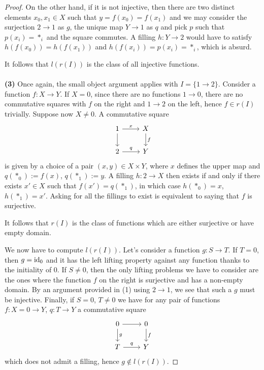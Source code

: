 \documentclass[a4paper,11pt,openany]{scrartcl}
\begin{document}
\begin{proof}
    \noindent On the other hand, if it is not
    injective, then there are two distinct elements $x_0,x_1\in X$ such that
    $y=f(x_0)=f(x_1)$ and we may consider the surjection $2\rightarrow 1$ as
    $g$, the unique map $Y\rightarrow 1$ as $q$ and pick $p$ such that
    $p(x_i)=*_i$ and the square commutes. A filling $h\colon Y\rightarrow 2$
    would have to satisfy $h(f(x_0))=h(f(x_1))$ and $h(f(x_i))=p(x_i)=*_i$,
    which is absurd.

    \noindent It follows that $l(r(I))$ is the class of all injective functions.\\
    \\
     \textbf{(3)} Once again, the small object argument applies with $I=\{1\rightarrow
    2\}$. Consider a function $f\colon X\rightarrow Y$. If $X=0$, since there
    are no functions $1\rightarrow 0$, there are no commutative squares with $f$
    on the right and $1\rightarrow 2$ on the left, hence $f\in r(I)$ trivially.
    Suppose now $X\neq 0$. A commutative square
    \[\begin{tikzcd}
	{1} & {X} \\
	{2} & {Y}
	\arrow["{x}", from=1-1, to=1-2]
	\arrow["{q}", from=2-1, to=2-2]
	\arrow[from=1-1, to=2-1]
	\arrow["{f}", from=1-2, to=2-2]
    \end{tikzcd}\]
    is given by a choice of a pair $(x,y)\in X\times Y$, where $x$ defines the
    upper map and $q(*_0):=f(x)$, $q(*_1):=y$. A filling $h\colon 2\rightarrow
    X$ then exists if and only if there exists $x'\in X$ such that
    $f(x')=q(*_1)$, in which case $h(*_0)=x$, $h(*_1)=x'$. Asking for all the
    fillings to exist is equivalent to saying that $f$ is surjective.

    It follows that $r(I)$ is the class of functions which are either surjective
    or have empty domain.

    We now have to compute $l(r(I))$. Let's consider a function $g\colon
    S\rightarrow T$. If $T=0$, then $g=\operatorname{id}_0$ and it has the left lifting
    property against any function thanks to the initiality of 0. If $S\neq 0$,
    then the only lifting problems we have to consider are the ones where the
    function $f$ on the right is surjective and has a non-empty domain. By an
    argument provided in (1) using $2\rightarrow 1$, we see that such a $g$ must
    be injective. Finally,
    if $S=0$, $T\neq 0$ we have for any pair of functions $f\colon
    X=0\rightarrow Y$, $q\colon T\rightarrow Y$ a commutative square
    \[\begin{tikzcd}
	{0} & {0} \\
	{T} & {Y}
	\arrow[from=1-1, to=1-2]
	\arrow["{q}", from=2-1, to=2-2]
    \arrow["{g}", from=1-1, to=2-1]
	\arrow["{f}", from=1-2, to=2-2]
    \end{tikzcd}\]
    which does not admit a filling, hence $g\not\in l(r(I))$.


\end{proof}
\end{document}
